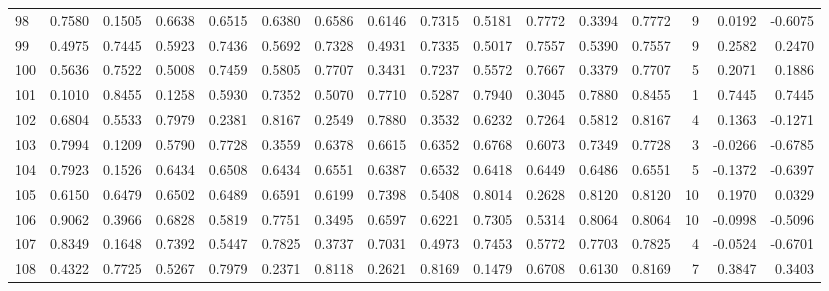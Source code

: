 \begin{tabular}{lrrrrrrrrrrrrrrr}
98  &      0.7580 &  0.1505 &  0.6638 &  0.6515 &  0.6380 &  0.6586 &  0.6146 &  0.7315 &  0.5181 &  0.7772 &   0.3394 &     0.7772 &      9 &                    0.0192 &                    -0.6075 \\
99  &      0.4975 &  0.7445 &  0.5923 &  0.7436 &  0.5692 &  0.7328 &  0.4931 &  0.7335 &  0.5017 &  0.7557 &   0.5390 &     0.7557 &      9 &                    0.2582 &                     0.2470 \\
100 &      0.5636 &  0.7522 &  0.5008 &  0.7459 &  0.5805 &  0.7707 &  0.3431 &  0.7237 &  0.5572 &  0.7667 &   0.3379 &     0.7707 &      5 &                    0.2071 &                     0.1886 \\
101 &      0.1010 &  0.8455 &  0.1258 &  0.5930 &  0.7352 &  0.5070 &  0.7710 &  0.5287 &  0.7940 &  0.3045 &   0.7880 &     0.8455 &      1 &                    0.7445 &                     0.7445 \\
102 &      0.6804 &  0.5533 &  0.7979 &  0.2381 &  0.8167 &  0.2549 &  0.7880 &  0.3532 &  0.6232 &  0.7264 &   0.5812 &     0.8167 &      4 &                    0.1363 &                    -0.1271 \\
103 &      0.7994 &  0.1209 &  0.5790 &  0.7728 &  0.3559 &  0.6378 &  0.6615 &  0.6352 &  0.6768 &  0.6073 &   0.7349 &     0.7728 &      3 &                   -0.0266 &                    -0.6785 \\
104 &      0.7923 &  0.1526 &  0.6434 &  0.6508 &  0.6434 &  0.6551 &  0.6387 &  0.6532 &  0.6418 &  0.6449 &   0.6486 &     0.6551 &      5 &                   -0.1372 &                    -0.6397 \\
105 &      0.6150 &  0.6479 &  0.6502 &  0.6489 &  0.6591 &  0.6199 &  0.7398 &  0.5408 &  0.8014 &  0.2628 &   0.8120 &     0.8120 &     10 &                    0.1970 &                     0.0329 \\
106 &      0.9062 &  0.3966 &  0.6828 &  0.5819 &  0.7751 &  0.3495 &  0.6597 &  0.6221 &  0.7305 &  0.5314 &   0.8064 &     0.8064 &     10 &                   -0.0998 &                    -0.5096 \\
107 &      0.8349 &  0.1648 &  0.7392 &  0.5447 &  0.7825 &  0.3737 &  0.7031 &  0.4973 &  0.7453 &  0.5772 &   0.7703 &     0.7825 &      4 &                   -0.0524 &                    -0.6701 \\
108 &      0.4322 &  0.7725 &  0.5267 &  0.7979 &  0.2371 &  0.8118 &  0.2621 &  0.8169 &  0.1479 &  0.6708 &   0.6130 &     0.8169 &      7 &                    0.3847 &                     0.3403 \\

\end{tabular}
